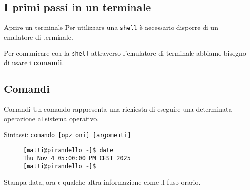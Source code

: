 \subsection{I primi passi in un terminale}
\begin{frame}{Aprire un terminale}
  Per utilizzare una \texttt{shell} è necessario disporre di un emulatore di 
  terminale.\bigskip
  
  Per comunicare con la \texttt{shell} attraverso l'emulatore di terminale
  abbiamo bisogno di usare i \textbf{comandi}.\bigskip
\end{frame}

\subsection{Comandi}
\begin{frame}[fragile]{Comandi}
  Un comando rappresenta una richiesta di eseguire una determinata operazione al
  sistema operativo.\bigskip

  Sintassi: \texttt{comando [opzioni] [argomenti]}

  \begin{figure}
    \begin{lstlisting}
[matti@pirandello ~]$ date
Thu Nov 4 05:00:00 PM CEST 2025
[matti@pirandello ~]$
    \end{lstlisting}
  \end{figure}
  \begin{flushright}
    \footnotesize
      Stampa data, ora e qualche altra informazione come il fuso orario.
  \end{flushright}
\end{frame}
